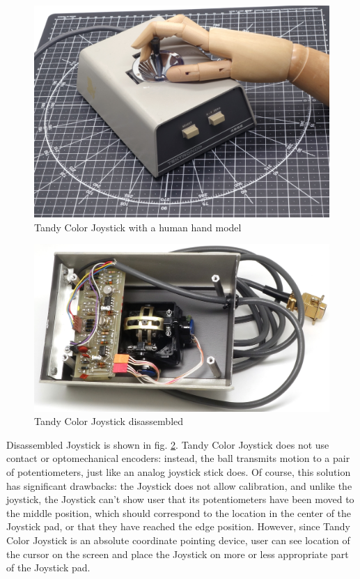 \documentclass[11pt, a4paper]{article}
\begin{document}
\begin{figure}[h]
    \centering
    \includegraphics[scale=0.55]{1975_Tektronix_4952_Joystick/hand_05.jpg}
    \caption{Tandy Color Joystick with a human hand model}
    \label{fig:TektronixJoystickHand}
\end{figure}



\begin{figure}[h]
    \centering
    \includegraphics[scale=0.8]{1975_Tektronix_4952_Joystick/inside_30.jpg}
    \caption{Tandy Color Joystick disassembled}
    \label{fig:TektronixJoystickInside}
\end{figure}

Disassembled Joystick is shown in fig. \ref{fig:TektronixJoystickInside}. Tandy Color Joystick does not use contact or optomechanical encoders: instead, the ball transmits motion to a pair of potentiometers, just like an analog joystick stick does. Of course, this solution has significant drawbacks: the Joystick does not allow calibration, and unlike the joystick, the Joystick can't show user that its potentiometers have been moved to the middle position, which should correspond to the location in the center of the Joystick pad, or that they have reached the edge position. However, since Tandy Color Joystick is an absolute coordinate pointing device, user can see location of the cursor on the screen and place the Joystick on more or less appropriate part of the Joystick pad.
\end{document}
